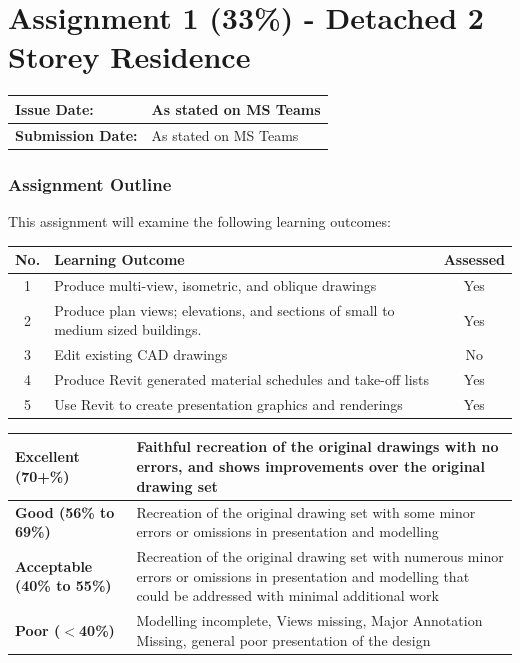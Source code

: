 
	
\part*{Assignment 1 (33\%) - Detached 2 Storey Residence}

\begin{tabularx}{\textwidth}{ |X|X| }
	\hline
	\textbf{Issue Date:} & As stated on MS Teams \\
	\hline 
	\textbf{Submission Date:}  & As stated on MS Teams \\
	\hline
\end{tabularx}


\section*{Assignment Outline}

This assignment will examine the following learning outcomes:\\

\begin{tabularx}{\textwidth}{ |c|X|c| }
	\hline
	\textbf{No.} & \textbf{Learning Outcome} & \textbf{Assessed} \\
	\hline 
	1  & Produce multi-view, isometric, and oblique drawings & Yes \\
	2  & Produce plan views; elevations, and sections of small to medium sized buildings. & Yes \\
	3  & Edit existing CAD drawings & No \\
	4  & Produce Revit generated material schedules and take-off lists & Yes \\
	5  & Use Revit to create presentation graphics and renderings & Yes \\
	\hline
\end{tabularx}

\vspace{1cm}

\begin{tabularx}{\textwidth}{ |l|X| }
	\hline 
	\textbf{Excellent (70+\%)} & Faithful recreation of the original drawings with no errors, and shows improvements over the original drawing set\\ 
	\hline
	\textbf{Good (56\% to 69\%)} & Recreation of the original drawing set with some minor errors or omissions in presentation and modelling \\
	\hline
	\textbf{Acceptable (40\% to 55\%)} & Recreation of the original drawing set with numerous minor errors or omissions in presentation and modelling that could be addressed with minimal additional work \\ 
	\hline
	\textbf{Poor ($<$40\%)} & Modelling incomplete, Views missing, Major Annotation Missing, general poor presentation of the design  \\
	\hline
\end{tabularx}

